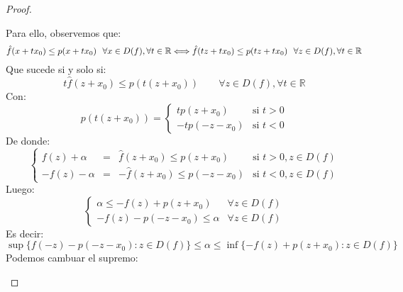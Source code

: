 \begin{teo}
\begin{proof}
\begin{itemize}
                Para ello, observemos que:
                \begin{equation*}
                    {\tiny \hat{f}(x+tx_0) \leq p(x+tx_0) \quad \forall x\in D(f), \forall t\in \mathbb{R} \Longleftrightarrow \hat{f}(tz+tx_0) \leq p(tz+tx_0) \quad \forall z\in D(f), \forall t\in \mathbb{R}}
                \end{equation*}
                Que sucede si y solo si:
                \begin{equation*}
                    t\hat{f}(z+x_0) \leq p(t(z+x_0)) \qquad \forall z\in D(f), \forall t\in \mathbb{R}
                \end{equation*}
                Con:
                \begin{equation*}
                    p(t(z+x_0)) = \left\{\begin{array}{ll}
                            tp(z+x_0) & \text{si\ } t > 0 \\
                            -tp(-z-x_0) & \text{si\ } t < 0
                    \end{array}\right.
                \end{equation*}
                De donde:
                \begin{equation*}
                    \left\{\begin{array}{rcll}
                            f(z) + \alpha &=& \hat{f}(z+x_0) \leq p(z+x_0) & \text{si\ } t>0, z\in D(f) \\
                            -f(z)-\alpha &=& -\hat{f}(z+x_0) \leq p(-z-x_0) & \text{si\ } t<0, z\in D(f)
                    \end{array}\right.
                \end{equation*}
                Luego:
                \begin{equation*}
                    \left\{\begin{array}{ll}
                            \alpha \leq -f(z) + p(z+x_0) & \forall z\in D(f) \\
                            -f(z) - p(-z-x_0) \leq \alpha & \forall z\in D(f)
                    \end{array}\right.
                \end{equation*}
                Es decir:
                \begin{equation*}
                    \sup\{f(-z)-p(-z-x_0) : z\in D(f)\} \leq \alpha \leq \inf\{-f(z)+p(z+x_0) : z\in D(f)\}
                \end{equation*}
                Podemos cambuar el supremo:

\end{itemize}
\end{proof}
\end{teo}
